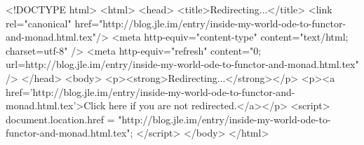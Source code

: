 <!DOCTYPE html>
<html>
<head>
<title>Redirecting...</title>
<link rel="canonical" href="http://blog.jle.im/entry/inside-my-world-ode-to-functor-and-monad.html.tex"/>
<meta http-equiv="content-type" content="text/html; charset=utf-8" />
<meta http-equiv="refresh" content="0; url=http://blog.jle.im/entry/inside-my-world-ode-to-functor-and-monad.html.tex" />
</head>
<body>
  <p><strong>Redirecting...</strong></p>
  <p><a href='http://blog.jle.im/entry/inside-my-world-ode-to-functor-and-monad.html.tex'>Click here if you are not redirected.</a></p>
  <script>
    document.location.href = "http://blog.jle.im/entry/inside-my-world-ode-to-functor-and-monad.html.tex";
  </script>
</body>
</html>
